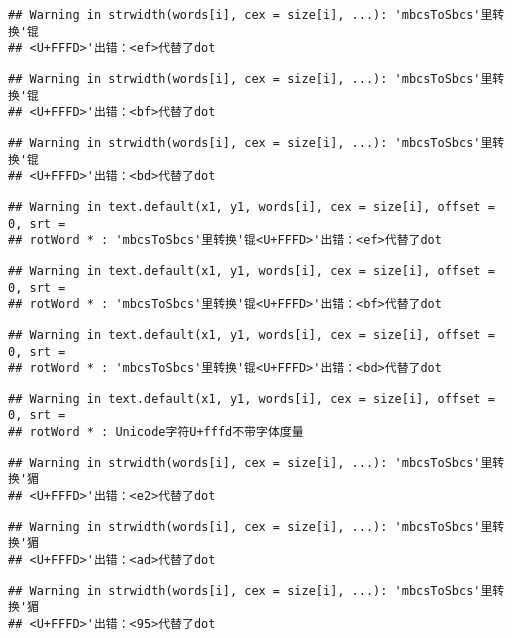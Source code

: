 \documentclass[]{article}
\begin{document}
\begin{verbatim}
## Warning in strwidth(words[i], cex = size[i], ...): 'mbcsToSbcs'里转换'锟
## <U+FFFD>'出错：<ef>代替了dot
\end{verbatim}

\begin{verbatim}
## Warning in strwidth(words[i], cex = size[i], ...): 'mbcsToSbcs'里转换'锟
## <U+FFFD>'出错：<bf>代替了dot
\end{verbatim}

\begin{verbatim}
## Warning in strwidth(words[i], cex = size[i], ...): 'mbcsToSbcs'里转换'锟
## <U+FFFD>'出错：<bd>代替了dot
\end{verbatim}

\begin{verbatim}
## Warning in text.default(x1, y1, words[i], cex = size[i], offset = 0, srt =
## rotWord * : 'mbcsToSbcs'里转换'锟<U+FFFD>'出错：<ef>代替了dot
\end{verbatim}

\begin{verbatim}
## Warning in text.default(x1, y1, words[i], cex = size[i], offset = 0, srt =
## rotWord * : 'mbcsToSbcs'里转换'锟<U+FFFD>'出错：<bf>代替了dot
\end{verbatim}

\begin{verbatim}
## Warning in text.default(x1, y1, words[i], cex = size[i], offset = 0, srt =
## rotWord * : 'mbcsToSbcs'里转换'锟<U+FFFD>'出错：<bd>代替了dot
\end{verbatim}

\begin{verbatim}
## Warning in text.default(x1, y1, words[i], cex = size[i], offset = 0, srt =
## rotWord * : Unicode字符U+fffd不带字体度量
\end{verbatim}

\begin{verbatim}
## Warning in strwidth(words[i], cex = size[i], ...): 'mbcsToSbcs'里转换'猸
## <U+FFFD>'出错：<e2>代替了dot
\end{verbatim}

\begin{verbatim}
## Warning in strwidth(words[i], cex = size[i], ...): 'mbcsToSbcs'里转换'猸
## <U+FFFD>'出错：<ad>代替了dot
\end{verbatim}

\begin{verbatim}
## Warning in strwidth(words[i], cex = size[i], ...): 'mbcsToSbcs'里转换'猸
## <U+FFFD>'出错：<95>代替了dot
\end{verbatim}
\end{document}

